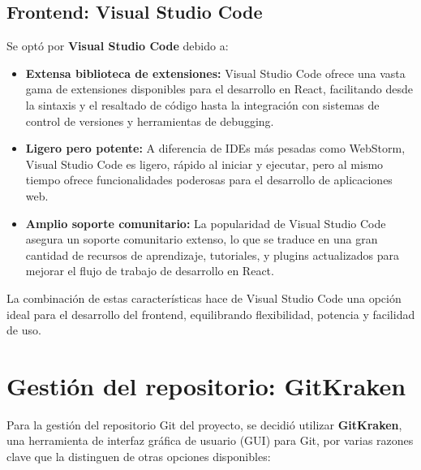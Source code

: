 \subsection{Frontend: Visual Studio Code}
Se optó por \textbf{Visual Studio Code}\cite{VSCode} debido a:
\begin{itemize}
    \item \textbf{Extensa biblioteca de extensiones:} Visual Studio Code ofrece una vasta gama de extensiones disponibles para el desarrollo en React, facilitando desde la sintaxis y el resaltado de código hasta la integración con sistemas de control de versiones y herramientas de debugging.
    \item \textbf{Ligero pero potente:} A diferencia de IDEs más pesadas como WebStorm, Visual Studio Code es ligero, rápido al iniciar y ejecutar, pero al mismo tiempo ofrece funcionalidades poderosas para el desarrollo de aplicaciones web.
    \item \textbf{Amplio soporte comunitario:} La popularidad de Visual Studio Code asegura un soporte comunitario extenso, lo que se traduce en una gran cantidad de recursos de aprendizaje, tutoriales, y plugins actualizados para mejorar el flujo de trabajo de desarrollo en React.
\end{itemize}
La combinación de estas características hace de Visual Studio Code una opción ideal para el desarrollo del frontend, equilibrando flexibilidad, potencia y facilidad de uso.

\section{Gestión del repositorio: GitKraken}
Para la gestión del repositorio Git del proyecto, se decidió utilizar \textbf{GitKraken}\cite{GitKraken}, una herramienta de interfaz gráfica de usuario (GUI) para Git, por varias razones clave que la distinguen de otras opciones disponibles:


